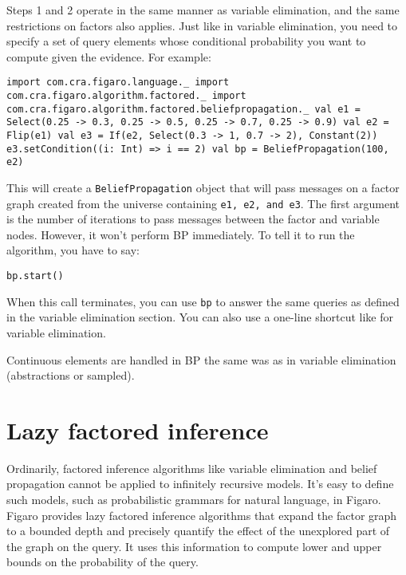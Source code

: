 Steps 1 and 2 operate in the same manner as variable elimination, and the same restrictions on factors also applies. Just like in variable elimination, you need to specify a set of query elements whose conditional probability you want to compute given the evidence. For example:

\begin{flushleft}
\texttt{import com.cra.figaro.language.\_
\newline import com.cra.figaro.algorithm.factored.\_
\newline import com.cra.figaro.algorithm.factored.beliefpropagation.\_
\newline 
\newline val e1 = Select(0.25 -> 0.3, 0.25 -> 0.5, 0.25 -> 0.7, 0.25 -> 0.9)
\newline val e2 = Flip(e1)
\newline val e3 = If(e2, Select(0.3 -> 1, 0.7 -> 2), Constant(2))
\newline e3.setCondition((i: Int) => i == 2)
\newline 
\newline val bp = BeliefPropagation(100, e2)}
\end{flushleft}

This will create a \texttt{BeliefPropagation} object that will pass messages on a factor graph created from the universe containing \texttt{e1, e2, and e3}. The first argument is the number of iterations to pass messages between the factor and variable nodes. However, it won't perform BP immediately. To tell it to run the algorithm, you have to say:

\begin{flushleft}
\texttt{bp.start()}
\end{flushleft}

When this call terminates, you can use \texttt{bp} to answer the same queries as defined in the variable elimination section. You can also use a one-line shortcut like for variable elimination.

Continuous elements are handled in BP the same was as in variable elimination (abstractions or sampled).

\section{Lazy factored inference}

Ordinarily, factored inference algorithms like variable elimination and belief propagation cannot be applied to infinitely recursive models. It's easy to define such models, such as probabilistic grammars for natural language, in Figaro. Figaro provides lazy factored inference algorithms that expand the factor graph to a bounded depth and precisely quantify the effect of the unexplored part of the graph on the query. It uses this information to compute lower and upper bounds on the probability of the query. 

